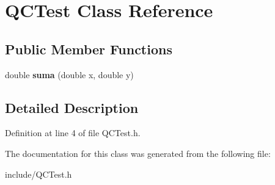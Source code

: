\hypertarget{class_q_c_test}{\section{Q\+C\+Test Class Reference}
\label{class_q_c_test}
}
\subsection*{Public Member Functions}
\begin{DoxyCompactItemize}
\item 
\hypertarget{class_q_c_test_a4514a7e167dc3a413d6fa7dcf0a8bf93}{double {\bfseries suma} (double x, double y)}\label{class_q_c_test_a4514a7e167dc3a413d6fa7dcf0a8bf93}

\end{DoxyCompactItemize}


\subsection{Detailed Description}


Definition at line 4 of file Q\+C\+Test.\+h.



The documentation for this class was generated from the following file\+:\begin{DoxyCompactItemize}
\item 
include/Q\+C\+Test.\+h\end{DoxyCompactItemize}
